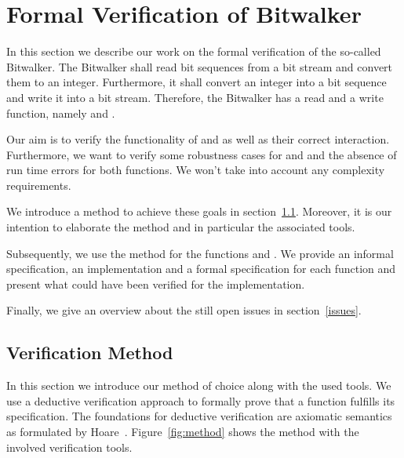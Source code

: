 
\section{Formal Verification of Bitwalker}
\label{sec:formal-verification}


In this section we describe our work on the formal verification
of the so-called Bitwalker.
The Bitwalker shall read bit sequences from a bit stream 
and convert them to an integer. Furthermore, it shall
convert an integer into a bit sequence and write it into a bit stream.
Therefore, the Bitwalker has a read and a write function, namely \peek and \poke.

Our aim is to verify the functionality of
\peek and \poke
as well as their correct interaction.
Furthermore, we want to verify some robustness cases for \peek and \poke
and the absence of run time errors for both functions.
We won't take into account any complexity requirements.

We introduce a method to achieve these goals in section~\ref{plan}.
Moreover, it is our intention
to elaborate the method and in particular the associated tools.

Subsequently, we use the method for the functions \peek and \poke.
We provide an informal specification, an implementation and
a formal specification for each function and
present what could have been verified for the implementation.

Finally, we give an overview about the still open issues in section~\ref{issues}.


\clearpage

\subsection{Verification Method}
\label{plan}
\label{method}


In this section we introduce our method of choice along with the used tools.
We use a deductive verification approach to 
formally prove that a function fulfills its specification.
The foundations for deductive verification are axiomatic semantics as formulated
by Hoare~\cite{HoareCalculus}.
Figure~\ref{fig:method} shows the method with the involved verification tools.

